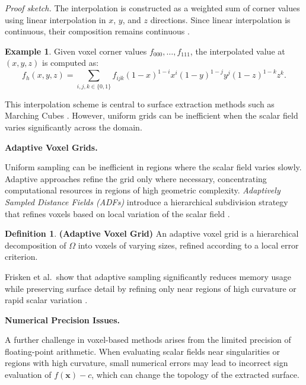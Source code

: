 \documentclass[12pt, a4paper, oneside]{book}
\theoremstyle{plain}
\theoremstyle{definition}
\newtheorem{definition}[theorem]{Definition}
\newtheorem{example}[theorem]{Example}
\theoremstyle{remark}
\theoremstyle{definition}
\begin{document}
\textit{Proof sketch.} The interpolation is constructed as a weighted sum of corner
values using linear interpolation in $x$, $y$, and $z$ directions. Since linear
interpolation is continuous, their composition remains continuous
\cite{lorensen1998marching}.

\begin{example}
    Given voxel corner values $f_{000}, \dots, f_{111}$, the interpolated value at
    $(x,y,z)$ is computed as:
\[
f_h(x,y,z) = \sum_{i,j,k \in \{0,1\}} f_{ijk}(1-x)^{1-i}x^i(1-y)^{1-j}y^j
(1-z)^{1-k}z^k.
\]
\end{example}

This interpolation scheme is central to surface extraction methods such as Marching Cubes
\cite{lorensen1998marching}. However, uniform grids can be inefficient when the scalar
field varies significantly across the domain.

\vspace{0.5em}

\textbf{Adaptive Voxel Grids.}

Uniform sampling can be inefficient in regions where the scalar field varies slowly.
Adaptive approaches refine the grid only where necessary, concentrating computational
resources in regions of high geometric complexity. \emph{Adaptively Sampled Distance
Fields (ADFs)} introduce a hierarchical subdivision strategy that refines voxels based on
local variation of the scalar field \cite{frisken2000adaptively}.

\begin{definition}
    \textbf{(Adaptive Voxel Grid)}
An adaptive voxel grid is a hierarchical decomposition of $\Omega$ into voxels of
varying sizes, refined according to a local error criterion.
\end{definition}

Frisken et al.\ show that adaptive sampling significantly reduces memory usage while
preserving surface detail by refining only near regions of high curvature or rapid scalar
variation \cite{frisken2000adaptively}.

\vspace{0.5em}

\textbf{Numerical Precision Issues.}

A further challenge in voxel-based methods arises from the limited precision of
floating-point arithmetic. When evaluating scalar fields near singularities or regions
with high curvature, small numerical errors may lead to incorrect sign evaluation of
$f(\mathbf{x}) - c$, which can change the topology of the extracted surface.
\end{document}
